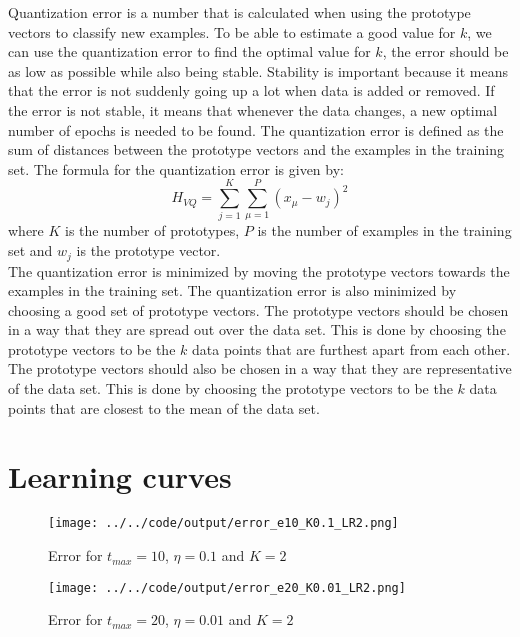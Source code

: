 \documentclass[twoside, a4paper, fleqn, reqno]{article}
\begin{document}
Quantization error is a number that is calculated when using the prototype vectors to classify new examples.
To be able to estimate a good value for $k$, we can use the quantization error to find the optimal value for $k$,
the error should be as low as possible while also being stable. Stability is important because it means that the error is not suddenly going up a lot when data is added or removed.
If the error is not stable, it means that whenever the data changes, a new optimal number of epochs is needed to be found.
The quantization error is defined as the sum of distances between the prototype vectors and the examples in the training set.
The formula for the quantization error is given by:
\begin{equation*}
H_{VQ}=\sum_{j=1}^K \sum_{\mu=1}^P (x_{\mu}-w_j)^2
\end{equation*}
where $K$ is the number of prototypes, $P$ is the number of examples in the training set and $w_j$ is the prototype vector. \\

The quantization error is minimized by moving the prototype vectors towards the examples in the training set.
The quantization error is also minimized by choosing a good set of prototype vectors.
The prototype vectors should be chosen in a way that they are spread out over the data set.
This is done by choosing the prototype vectors to be the $k$ data points that are furthest apart from each other.
The prototype vectors should also be chosen in a way that they are representative of the data set.
This is done by choosing the prototype vectors to be the $k$ data points that are closest to the mean of the data set.

\section{Learning curves}

\begin{figure}[H]
	\centering
	\texttt{[image: ../../code/output/error\_e10\_K0.1\_LR2.png]}
	\caption{Error for $t_{max}=10$, $\eta = 0.1$ and $K = 2$}
	\label{fig:error_e10_K0.1_LR2}
\end{figure}

\begin{figure}[H]
	\centering
	\texttt{[image: ../../code/output/error\_e20\_K0.01\_LR2.png]}
	\caption{Error for $t_{max}=20$, $\eta = 0.01$ and $K = 2$}
	\label{fig:error_e20_K0.01_LR2}
\end{figure}
\end{document}
